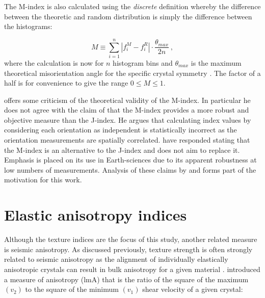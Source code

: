 \documentclass[a4paper,12pt,twoside]{report}
\numberwithin{equation}{chapter}
\begin{document}
The M-index is also calculated using the \emph{discrete} definition whereby the difference between the theoretic and random distribution is simply the difference between the histograms:

\begin{equation} \label{eq:Mindex_disc}
M \equiv \sum_{i=1}^n | f_i^M - f_i^R | \cdot \frac{\theta_{max}}{2n}\ ,
\end{equation} 
where the calculation is now for $n$ histogram bins and $\theta_{max}$ is the maximum theoretical misorientation angle for the specific crystal symmetry \citep[for discussion on misorientation angle distirbutions for various crystal symmetries see][and references therein]{Grimmer1979,Wheeler2001}. The factor of a half is for convenience to give the range $0 \leq M \leq 1$. 

  

\cite{Schaeben2007} offers some criticism of the theoretical validity of the M-index. In particular he does not agree with the claim of \cite{Skemer} that the M-index provides a more robust and objective measure than the J-index. He argues that calculating index values by considering each orientation as independent is statistically incorrect as the orientation measurements are spatially correlated. \cite{Skemer2007reply} have responded stating that the M-index is an alternative to the J-index and does not aim to replace it. Emphasis is placed on its use in Earth-sciences due to its apparent robustness at low numbers of measurements. Analysis of these claims by \cite{Skemer} and \cite{Skemer2007reply} forms part of the motivation for this work.  

\section{Elastic anisotropy indices} \label{sec:anisotropy_indices}

Although the texture indices are the focus of this study, another related measure is seismic anisotropy. As discussed previously, texture strength is often strongly related to seismic anisotropy as the alignment of individually elastically anisotropic crystals can result in bulk anisotropy for a given material \citep[e.g.][]{Tommasi1999,Miyagi2010}. \cite{Ledbetter2006} introduced a measure of anisotropy (lmA) that is the ratio of the square of the maximum $(v_2)$ to the square of the minimum $(v_1)$ shear velocity of a given crystal:
\end{document}
